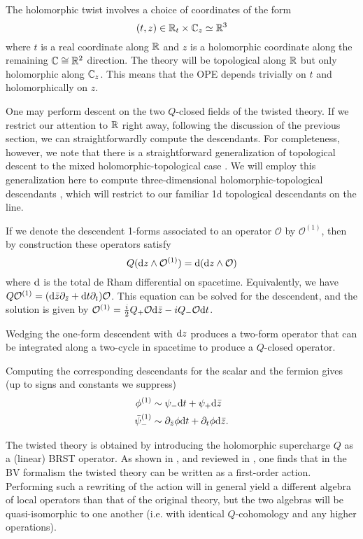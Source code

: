 \documentclass[11pt]{amsart}
\begin{document}
The holomorphic twist involves a choice of coordinates of the form
\[
(t , z) \in \mathbb R_t \times \mathbb C_z \simeq \mathbb R^3
\]
where $t$ is a real coordinate along $\mathbb R$ and $z$ is a holomorphic coordinate along the remaining $\mathbb C \cong \mathbb R^2$ direction. 
The theory will be topological along $\mathbb R$ but only holomorphic along $\mathbb C_z$. 
This means that the OPE depends trivially on $t$ and holomorphically on $z$. 

One may perform descent on the two $Q$-closed fields of the twisted theory. If we restrict our attention to $\mathbb R$ right away, following the discussion of the previous section, we can straightforwardly compute the descendants. For completeness, however, we note that there is a straightforward generalization of topological descent to the mixed holomorphic-topological case \cite{OY}.  We will employ this generalization here to compute three-dimensional holomorphic-topological descendants \cite{CDG}, which will restrict to our familiar 1d topological descendants on the line. 

If we denote the descendent 1-forms associated to an operator $\mathcal{O}$ by $\mathcal{O}^{(1)}$, then by construction these operators satisfy
\[
Q({\rm d} z \wedge \mathcal{O}^{(1)}) = {\rm d} ({\rm d} z \wedge \mathcal{O})
\]
where ${\rm d}$ is the total de Rham differential on spacetime. Equivalently, we have $Q \mathcal{O}^{(1)} = ({\rm d} \bar{z}\partial_{\bar{z}} + {\rm d} t \partial_t)\mathcal{O}$. 
This equation can be solved for the descendent, and the solution is given by $\mathcal{O}^{(1)} = {i \over 2}Q_+ \mathcal{O} {\rm d}\bar{z} - i Q_- \mathcal{O} {\rm d} t$. 

Wedging the one-form descendent with ${\rm d} z$ produces a two-form operator that can be integrated along a two-cycle in spacetime to produce a $Q$-closed operator. 

Computing the corresponding descendants for the scalar and the fermion gives (up to signs and constants we suppress)
\begin{align}
\label{eqn:N=2desc1}
\phi^{(1)} &\sim \psi_{-} {\rm d} t + \psi_+ {\rm d} \bar{z} \\
\label{eqn:N=2desc2}
\bar{\psi}_-^{(1)} &\sim \partial_{\bar{z}}\phi {\rm d} t + \partial_t \phi {\rm d} \bar{z}.
\end{align}

The twisted theory is obtained by introducing the holomorphic supercharge $Q$ as a (linear) BRST operator. 
As shown in \cite{ACNV}, and reviewed in \cite{CDG,ESW}, one finds that in the BV formalism the twisted theory can be written as a first-order action.
Performing such a rewriting of the action will in general yield a different algebra of local operators than that of the original theory, but the two algebras will be quasi-isomorphic to one another (i.e. with identical $Q$-cohomology and any higher operations).
\end{document}
